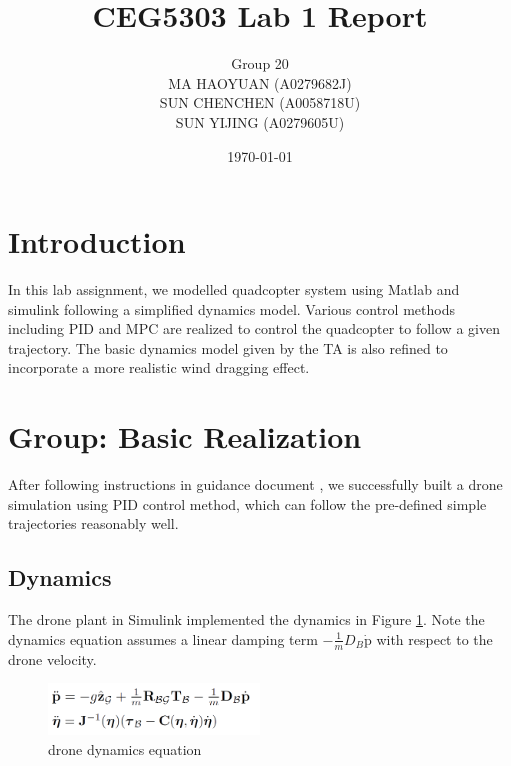 \documentclass[12pt]{article}
\title{CEG5303 Lab 1 Report}
\author{Group 20 \\MA HAOYUAN (A0279682J)\\SUN CHENCHEN (A0058718U)\\ SUN YIJING (A0279605U)}
\date{\today}
\begin{document}
\maketitle

\tableofcontents

\newpage
{}

\section{Introduction}
In this lab assignment, we modelled quadcopter system using Matlab and simulink following a simplified dynamics model. Various control methods including PID and MPC are realized to control the quadcopter to follow a given trajectory.
The basic dynamics model given by the TA is also refined to
incorporate a more realistic wind dragging effect.

\section{Group: Basic Realization}
\label{sec:basic_realization}
After following instructions in guidance document \cite{lab1_guidance},
we successfully built a drone simulation using PID control method, which can follow the pre-defined simple trajectories
reasonably well.

\subsection{Dynamics}
The drone plant in Simulink implemented the dynamics in Figure \ref{fig:dynamics_model}.
Note the dynamics equation assumes a linear damping term $-\frac{1}{m}D_B\dot{\text{p}}$ with respect to the drone velocity.


\begin{figure}[H]
    \centering
    \includegraphics[width=0.5\textwidth]{figures/dynamics_model}
    \caption{drone dynamics equation}
    \label{fig:dynamics_model}
\end{figure}
\end{document}
